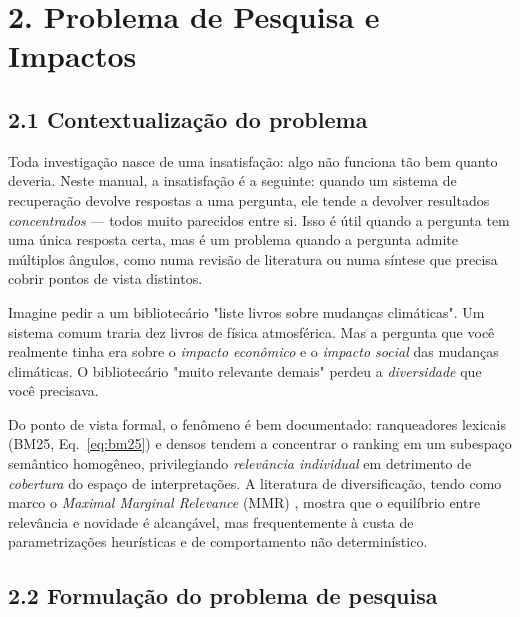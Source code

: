 
\section*{2. Problema de Pesquisa e Impactos}

\subsection*{2.1 Contextualização do problema}

 Toda investigação nasce de uma insatisfação: algo não funciona tão bem
quanto deveria. Neste manual, a insatisfação é a seguinte: quando um sistema de
recuperação devolve respostas a uma pergunta, ele tende a devolver resultados
\emph{concentrados} --- todos muito parecidos entre si. Isso é útil quando a
pergunta tem uma única resposta certa, mas é um problema quando a pergunta admite
múltiplos ângulos, como numa revisão de literatura ou numa síntese que precisa
cobrir pontos de vista distintos.

\begin{intuicao}
Imagine pedir a um bibliotecário "liste livros sobre mudanças climáticas". Um
sistema comum traria dez livros de física atmosférica. Mas a pergunta que você
realmente tinha era sobre o \emph{impacto econômico} e o \emph{impacto social}
das mudanças climáticas. O bibliotecário "muito relevante demais" perdeu a
\emph{diversidade} que você precisava.
\end{intuicao}

 Do ponto de vista formal, o fenômeno é bem documentado: ranqueadores
lexicais (BM25, Eq.~\ref{eq:bm25}) e densos tendem a concentrar o ranking em um
subespaço semântico homogêneo, privilegiando \emph{relevância individual} em
detrimento de \emph{cobertura} do espaço de interpretações. A literatura de
diversificação, tendo como marco o \emph{Maximal Marginal Relevance} (MMR)
\cite{CarbonellGoldstein1998MMR}, mostra que o equilíbrio entre relevância e
novidade é alcançável, mas frequentemente à custa de parametrizações heurísticas e
de comportamento não determinístico.

\subsection*{2.2 Formulação do problema de pesquisa}

